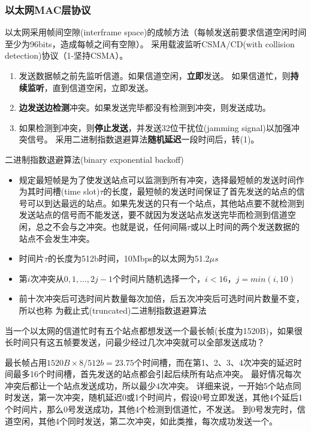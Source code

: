 \subsubsection{以太网MAC层协议}
以太网采用帧间空隙(interframe space)的成帧方法（每帧发送前要求信道空闲时间至少为96bits，造成每帧之间有空隙）。
采用载波监听CSMA/CD(with collision detection)协议（1-坚持CSMA）。
\begin{enumerate}
	\item 发送数据帧之前先监听信道。如果信道空闲，\textbf{立即}发送。
	如果信道忙，则\textbf{持续监听}，直到信道空闲，立即发送。
	\item \textbf{边发送边检测}冲突。如果发送完毕都没有检测到冲突，则发送成功。
	\item 如果检测到冲突，则\textbf{停止发送}，并发送32位干扰位(jamming signal)以加强冲突信号。
	采用二进制指数退避算法\textbf{随机延迟}一段时间后，转(1)。
\end{enumerate}

二进制指数退避算法(binary exponential backoff)
\begin{itemize}
	\item 规定最短帧是为了使发送站点可以监测到所有冲突，选择最短帧的发送时间作为其时间槽(time slot)$\tau$的长度，最短帧的发送时间保证了首先发送的站点的信号可以到达最远的站点。如果先发送的只有一个站点，其他站点要不就检测到发送站点的信号而不能发送，要不就因为发送站点发送完毕而检测到信道空闲，总之不会与之冲突。也就是说，任何间隔$\tau$或以上时间的两个发送数据的站点不会发生冲突。
	\item 时间片$\tau$的长度为512b时间，10Mbps的以太网为51.2$\mu s$
	\item 第$i$次冲突从$0,1,\ldots,2j-1$个时间片随机选择一个，$i<16$，$j = min(i,10)$
	\item 前十次冲突后可选时间片数量每次加倍，后五次冲突后可选时间片数量不变，所以也称	为截止式(truncated)二进制指数退避算法
\end{itemize}
\begin{example}
	当一个以太网的信道忙时有五个站点都想发送一个最长帧(长度为1520B)，如果很长时间只有这五帧要发送，问最少经过几次冲突就可以全部发送成功？
\end{example}
\begin{analysis}
	最长帧占用$1520B\times 8/512b=23.75$个时间槽，而在第1、2、3、4次冲突的延迟时间最多16个时间槽，首先发送的站点都会引起后续所有站点冲突。
	最好情况每次冲突后都让一个站点发送成功，所以最少4次冲突。
	详细来说，一开始5个站点同时发送，第一次冲突，随机延迟0或1个时间片，假设0号立即发送，其他4个延后1个时间片，那么0号发送成功，其他4个检测到信道忙，不发送。
	到0号发完时，信道空闲，其他4个同时发送，第二次冲突，如此类推，每次成功发送一个。
\end{analysis}

